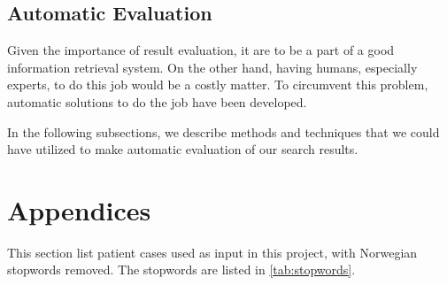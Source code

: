 \documentclass[a4paper, 12pt]{article}
\begin{document}
\subsection{Automatic Evaluation}
Given the importance of result evaluation, it are to be a part of a good information retrieval system. On the other hand, having humans, especially experts, to do this job would be a costly matter. To circumvent this problem, automatic solutions to do the job have been developed.

In the following subsections, we describe methods and techniques that we could have utilized to make automatic evaluation of our search results.



\appendix
\section{Appendices}
This section list patient cases used as input in this project, with Norwegian
stopwords removed. The stopwords are listed in \autoref{tab:stopwords}.


\end{document}

